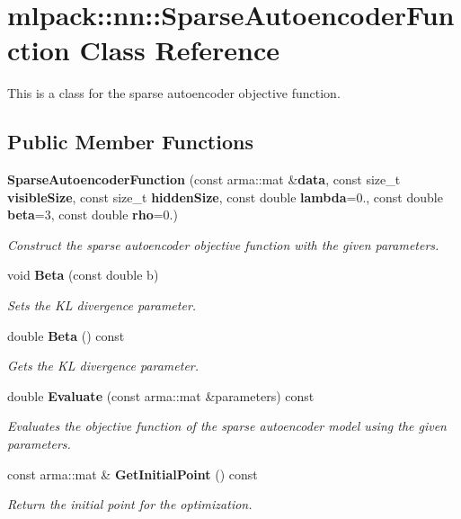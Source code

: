 \section{mlpack\-:\-:nn\-:\-:Sparse\-Autoencoder\-Function Class Reference}
\label{classmlpack_1_1nn_1_1SparseAutoencoderFunction}


This is a class for the sparse autoencoder objective function.  


\subsection*{Public Member Functions}
\begin{DoxyCompactItemize}
\item 
{\bf Sparse\-Autoencoder\-Function} (const arma\-::mat \&{\bf data}, const size\-\_\-t {\bf visible\-Size}, const size\-\_\-t {\bf hidden\-Size}, const double {\bf lambda}=0., const double {\bf beta}=3, const double {\bf rho}=0.)
\begin{DoxyCompactList}\small\item\em Construct the sparse autoencoder objective function with the given parameters. \end{DoxyCompactList}\item 
void {\bf Beta} (const double b)
\begin{DoxyCompactList}\small\item\em Sets the K\-L divergence parameter. \end{DoxyCompactList}\item 
double {\bf Beta} () const 
\begin{DoxyCompactList}\small\item\em Gets the K\-L divergence parameter. \end{DoxyCompactList}\item 
double {\bf Evaluate} (const arma\-::mat \&parameters) const 
\begin{DoxyCompactList}\small\item\em Evaluates the objective function of the sparse autoencoder model using the given parameters. \end{DoxyCompactList}\item 
const arma\-::mat \& {\bf Get\-Initial\-Point} () const 
\begin{DoxyCompactList}\small\item\em Return the initial point for the optimization. \end{DoxyCompactList}\item 

\end{DoxyCompactItemize}
